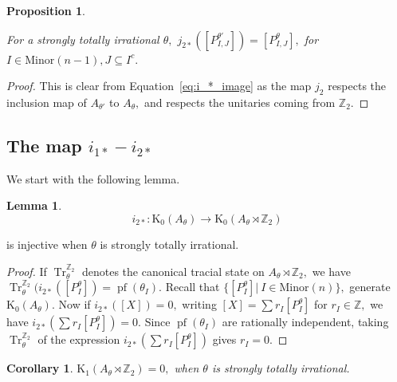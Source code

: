 \documentclass[9pt, BCOR=2mm]{amsart}
\numberwithin{equation}{section}
\numberwithin{equation}{section}
\newtheorem{lemma}[theorem]{Lemma}
\newtheorem{proposition}[theorem]{Proposition}
\newtheorem{corollary}[theorem]{Corollary}
\newcommand{\Z}{{\mathbb{Z}}}
\newcommand{\pf}{{\operatorname{pf}}}
\newcommand{\K}{\mathrm{K}} %
\DeclareMathOperator{\Tr}{Tr}
\newcommand{\m}[2]{\ensuremath{{#1}_{#2}}}
\begin{document}
\begin{proposition}\label{prop:gen_inclusion}

For a strongly totally irrational $\theta,$ $j_{2*}([P_{I,J}^{\theta'}]) = [P_{I,J}^{\theta}],$ for $I\in \mathrm{Minor}(n-1), J\subseteq I^c.$
\end{proposition}

 	
 \begin{proof}
    This is clear from Equation~\ref{eq:i_*_image} as the map $j_2$ respects the inclusion map of $A_{\theta'}$ to $A_{\theta},$ and respects the unitaries  coming from $\Z_2.$ 	
	 \end{proof}
	
	 \subsection*{The map $i_{1*}-i_{2*}$} 
 We start with the following lemma.
	 
	 \begin{lemma}\label{lemma:i_is_injective}
$$i_{2*} : \K_0(A_{\theta})\longrightarrow \K_0(A_{\theta}\rtimes \Z_2)$$	 \end{lemma} \noindent is injective when $\theta$ is strongly totally irrational. 

\begin{proof}
If $\Tr_\theta^{\Z_2}$ denotes the canonical tracial state on $A_{\theta}\rtimes \Z_2,$ we have  $\Tr_\theta^{\Z_2}(i_{2*}([P_{I}^{\theta}])= \pf(\m{\theta}{I}).$ Recall that $\{[P_I^\theta]|~ I \in \mathrm{Minor}(n)\},$ generate $\K_0(A_{\theta}).$ Now if 	$i_{2*}([X])= 0,$ writing  $[X]= \sum r_I [P_{I}^{\theta}]$ for  $r_I \in \Z,$ we have $i_{2*}(\sum r_I [P_I^{\theta}])=0.$ Since $\pf(\m{\theta}{I})$ are rationally independent, taking $\Tr_\theta^{\Z_2}$ of the expression $i_{2*}(\sum r_I [P_{I}^{\theta}])$ gives $r_I=0.$
\end{proof}

\begin{corollary}\label{cor:K_1_zero}
	$\K_1(A_{\theta}\rtimes \Z_2)=0,$ when $\theta$ is strongly totally irrational. 
\end{corollary}
\end{document}

